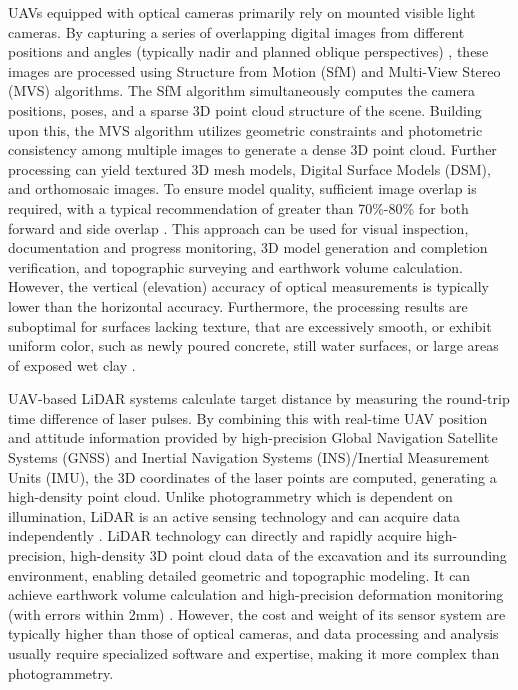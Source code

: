 \documentclass[preprint,11pt,authoryear,3p]{elsarticle}
\begin{document}
UAVs equipped with optical cameras primarily rely on mounted visible light cameras. By capturing a series of overlapping digital images from different positions and angles (typically nadir and planned oblique perspectives) \citep{guan2022review}, these images are processed using Structure from Motion (SfM) and Multi-View Stereo (MVS) algorithms. The SfM algorithm simultaneously computes the camera positions, poses, and a sparse 3D point cloud structure of the scene. Building upon this, the MVS algorithm utilizes geometric constraints and photometric consistency among multiple images to generate a dense 3D point cloud. Further processing can yield textured 3D mesh models, Digital Surface Models (DSM), and orthomosaic images. To ensure model quality, sufficient image overlap is required, with a typical recommendation of greater than 70\%-80\% for both forward and side overlap \citep{gonzalez2017unmanned,hu2023use}. This approach can be used for visual inspection, documentation and progress monitoring, 3D model generation and completion verification, and topographic surveying and earthwork volume calculation. However, the vertical (elevation) accuracy of optical measurements is typically lower than the horizontal accuracy. Furthermore, the processing results are suboptimal for surfaces lacking texture, that are excessively smooth, or exhibit uniform color, such as newly poured concrete, still water surfaces, or large areas of exposed wet clay \citep{wang2021multi}.

UAV-based LiDAR systems calculate target distance by measuring the round-trip time difference of laser pulses. By combining this with real-time UAV position and attitude information provided by high-precision Global Navigation Satellite Systems (GNSS) and Inertial Navigation Systems (INS)/Inertial Measurement Units (IMU), the 3D coordinates of the laser points are computed, generating a high-density point cloud. Unlike photogrammetry which is dependent on illumination, LiDAR is an active sensing technology and can acquire data independently \citep{yin2019individual}. LiDAR technology can directly and rapidly acquire high-precision, high-density 3D point cloud data of the excavation and its surrounding environment, enabling detailed geometric and topographic modeling. It can achieve earthwork volume calculation and high-precision deformation monitoring (with errors within 2mm) \citep{bao2025monitoring}. However, the cost and weight of its sensor system are typically higher than those of optical cameras, and data processing and analysis usually require specialized software and expertise, making it more complex than photogrammetry.
\end{document}
